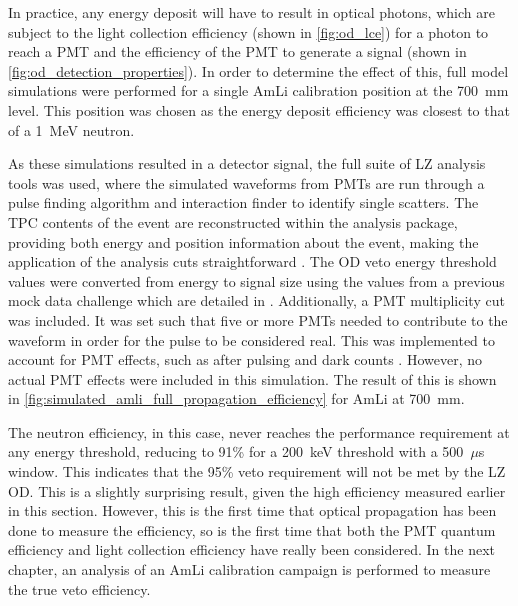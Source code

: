 



\par
In practice, any energy deposit will have to result in optical photons, which are subject to the light collection efficiency (shown in \autoref{fig:od_lce}) for a photon to reach a PMT and the efficiency of the PMT to generate a signal (shown in \autoref{fig:od_detection_properties}).
In order to determine the effect of this, full model simulations were performed for a single AmLi calibration position at the 700~mm level.
This position was chosen as the energy deposit efficiency was closest to that of a 1~MeV neutron.

\par
As these simulations resulted in a detector signal, the full suite of LZ analysis tools was used, where the simulated waveforms from PMTs are run through a pulse finding algorithm and interaction finder to identify single scatters.
The TPC contents of the event are reconstructed within the analysis package, providing both energy and position information about the event, making the application of the analysis cuts straightforward \cite{lz_simulations_ref}.
The OD veto energy threshold values were converted from energy to signal size using the values from a previous mock data challenge which are detailed in \cite{jonathannikoleyczik_thesis_ref}.
Additionally, a PMT multiplicity cut was included.
It was set such that five or more PMTs needed to contribute to the waveform in order for the pulse to be considered real.
This was implemented to account for PMT effects, such as after pulsing and dark counts \cite{jonathannikoleyczik_thesis_ref}.
However, no actual PMT effects were included in this simulation.
The result of this is shown in \autoref{fig:simulated_amli_full_propagation_efficiency} for AmLi at 700~mm. 

\par
The neutron efficiency, in this case, never reaches the performance requirement at any energy threshold, reducing to 91\% for a 200~keV threshold with a 500~$\mu$s window.
This indicates that the 95\% veto requirement will not be met by the LZ OD.
This is a slightly surprising result, given the high efficiency measured earlier in this section.
However, this is the first time that optical propagation has been done to measure the efficiency, so is the first time that both the PMT quantum efficiency and light collection efficiency have really been considered.
In the next chapter, an analysis of an AmLi calibration campaign is performed to measure the true veto efficiency.

